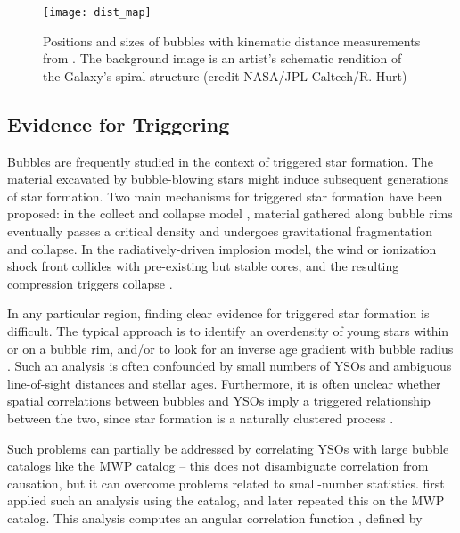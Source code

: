 \documentclass[preprint]{aastex}
\begin{document}
\begin{figure}[h!]
\texttt{[image: dist\_map]}
\caption{Positions and sizes of bubbles with kinematic distance measurements from \cite{Anderson11}. The background image is an artist's schematic rendition of the Galaxy's spiral structure (credit NASA/JPL-Caltech/R. Hurt)}
\label{fig:dist_map}
\end{figure}

\subsection{Evidence for Triggering}

Bubbles are frequently studied in the context of triggered star formation. The material excavated by bubble-blowing stars might induce subsequent generations of star formation. Two main mechanisms for triggered star formation have been proposed: in the collect and collapse model \citep{Whitworth94, Dale07}, material gathered along bubble rims eventually passes a critical density and undergoes gravitational fragmentation and collapse. In the radiatively-driven implosion model, the wind or ionization shock front collides with pre-existing but stable cores, and the resulting compression triggers collapse \citep{Bertoldi89}.

In any particular region, finding clear evidence for triggered star formation is difficult. The typical approach is to identify an overdensity of young stars within or on a bubble rim, and/or to look for an inverse age gradient with bubble radius \citep{Deharveng05, Zavagno06, Koenig08}. Such an analysis is often confounded by small numbers of YSOs and ambiguous line-of-sight distances and stellar ages. Furthermore, it is often unclear whether spatial correlations between bubbles and YSOs imply a triggered relationship between the two, since star formation is a naturally clustered process \citep{Lada03}.

Such problems can partially be addressed by correlating YSOs with large bubble catalogs like the MWP catalog -- this does not disambiguate correlation from causation, but it can overcome problems related to small-number statistics. \cite{Thompson12} first applied such an analysis using the \cite{Churchwell06} catalog, and \cite{Kendrew12} later repeated this on the MWP catalog. This analysis computes an angular correlation function \citep{Landy93, Bradshaw11}, defined by
\end{document}

